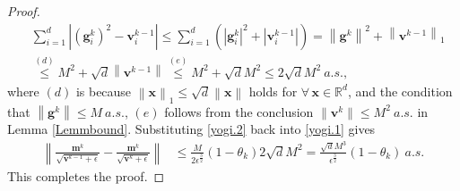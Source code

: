 \documentclass[twoside,11pt]{article}
\begin{document}
\begin{proof}
\begin{equation}\label{yogi.2}
   	\begin{aligned}
   	&\sum_{i=1}^{d}\left| (\mathbf{g}^{k}_i)^2-\mathbf{v}^{k-1}_i\right|
   	\le \sum_{i=1}^{d}\left( \left| \mathbf{g}^{k}_i\right|^2 +\left| \mathbf{v}^{k-1}_i\right|\right)
    = \left\| {\mathbf{g}}^{k}\right\|^2 +\left\| {\mathbf{v}}^{k-1}\right\|_1
    \\
   	&\overset{(d)}{\le} M^2+\sqrt{d}\left\| {\mathbf{v}}^{k-1}\right\|
   	\overset{(e)}{\le} M^2+\sqrt{d}M^2
   	\le 2\sqrt{d}M^2 \ a.s.,
   	\end{aligned}
\end{equation}
where $(d)$ is because $\left\| \mathbf{x}\right\|_1\le\sqrt{d}\left\| \mathbf{x}\right\|$ holds for $\forall\,\mathbf{x}\in\mathbb{R}^d$, and the condition that $\left\| \mathbf{g}^k\right\| \le M\ a.s.$, $(e)$  follows from the conclusion $ 
\lVert \mathbf{v}^k \rVert\le M^2\ a.s.$ in Lemma \ref{Lemmbound}. 
Substituting \eqref{yogi.2} back into \eqref{yogi.1} gives
\begin{equation}
   	\begin{aligned}
   	\left\| \frac{\mathbf{m}^k}{\sqrt{\mathbf{v}^{k-1}+\epsilon}}-\frac{\mathbf{m}^k}{\sqrt{\mathbf{v}^{k}+\epsilon}}\right\|
   	&\le\frac{M}{2\epsilon^{\frac{3}{2}}}(1-\theta_k)2\sqrt{d}M^2
   	=\frac{\sqrt{d}M^3}{\epsilon^{\frac{3}{2}}}(1-\theta_k)\ a.s.\nonumber
   	\end{aligned}
\end{equation}
This completes the proof.
\end{proof}
   
   
   
\end{document}
